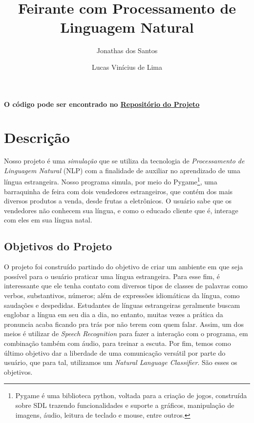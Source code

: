 \documentclass[a4paper]{article}
\title{Feirante com Processamento de Linguagem Natural}
\author{Jonathas dos Santos \and Lucas Vinícius de Lima}
\begin{document}
    \maketitle
    
    \begin{center}
        \textbf{
            O código pode ser encontrado no
            \href{https://github.com/Sevenings/Projeto-Final-Lia}
            {Repositório do Projeto}
        }
    \end{center}
    
    \section{Descrição}
        Nosso projeto é uma \emph{simulação} que se utiliza da tecnologia de
        \emph{Processamento de Linguagem Natural} (NLP) com a finalidade de
        auxiliar no aprendizado de uma língua estrangeira. Nosso programa
        simula, por meio do Pygame\footnote{Pygame é uma biblioteca python,
        voltada para a criação de jogos, construída sobre SDL trazendo
        funcionalidades e suporte a gráficos, manipulação de imagens, áudio,
        leitura de teclado e mouse, entre outros.}, uma barraquinha de feira com
        dois vendedores estrangeiros, que contém dos mais diversos produtos a
        venda, desde frutas a eletrônicos. O usuário sabe que os vendedores não
        conhecem sua língua, e como o educado cliente que é, interage com eles
        em sua língua natal. 
        
    \subsection{Objetivos do Projeto}

        O projeto foi construído partindo do objetivo de criar um ambiente em
        que seja possível para o usuário praticar uma língua estrangeira. Para
        esse fim, é interessante que ele tenha contato com diversos tipos de
        classes de palavras como verbos, substantivos, números; além de
        expressões idiomáticas da língua, como saudações e despedidas.
        Estudantes de línguas estrangeiras geralmente buscam englobar a língua
        em seu dia a dia, no entanto, muitas vezes a prática da pronuncia acaba
        ficando pra trás por não terem com quem falar. Assim, um dos meios é
        utilizar de \emph{Speech Recognition} para fazer a interação com o
        programa, em combinação também com áudio, para treinar a escuta. Por
        fim, temos como último objetivo dar a liberdade de uma comunicação
        versátil por parte do usuário, que para tal, utilizamos um \emph{Natural
        Language Classifier}. São esses os objetivos.
\end{document}
